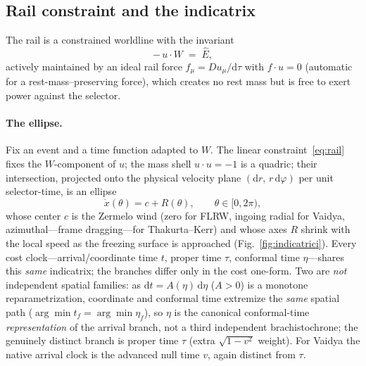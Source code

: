 \documentclass[
    aps, prd, twocolumn, superscriptaddress,
    showpacs, nofootinbib, floatfix
]{revtex4-2}
\newcommand{\Ehat}{\hat E}
\newcommand{\dd}{\mathrm{d}}
\begin{document}
\subsection{Rail constraint and the indicatrix}
\label{sec:indicatrix}
The rail is a constrained worldline with the invariant
\begin{equation}
    -\,u\cdot W \;=\; \Ehat ,
    \label{eq:rail}
\end{equation}
actively maintained by an ideal rail force $f_\mu=Du_\mu/\dd\tau$ with
$f\cdot u=0$ (automatic for a rest-mass--preserving force), which creates no rest
mass but is free to exert power against the selector.

\paragraph{The ellipse.} Fix an event and a time function adapted to $W$. The
linear constraint~\eqref{eq:rail} fixes the $W$-component of $u$; the mass shell
$u\cdot u=-1$ is a quadric; their intersection, projected onto the physical
velocity plane $(\dd r,\,r\,\dd\varphi)$ per unit selector-time, is an ellipse
\begin{equation}
    \dot x(\theta)=c+R(\theta),\qquad \theta\in[0,2\pi),
    \label{eq:ellipse}
\end{equation}
whose center $c$ is the Zermelo wind (zero for FLRW, ingoing radial for Vaidya,
azimuthal---frame dragging---for Thakurta--Kerr) and whose axes $R$ shrink with
the local speed as the freezing surface is approached (Fig.~\ref{fig:indicatrici}).
Every cost clock---arrival/coordinate time $t$, proper time $\tau$, conformal time
$\eta$---shares this \emph{same} indicatrix; the branches differ only in the cost
one-form. Two are \emph{not} independent spatial families: as $\dd t=A(\eta)\,\dd\eta$
($A>0$) is a monotone reparametrization, coordinate and conformal time extremize the
\emph{same} spatial path ($\arg\min t_f=\arg\min\eta_f$), so $\eta$ is the canonical
conformal-time \emph{representation} of the arrival branch, not a third independent
brachistochrone; the genuinely distinct branch is proper time $\tau$ (extra
$\sqrt{1-v^2}$ weight). For Vaidya the native arrival clock is the advanced null time
$v$, again distinct from $\tau$.
\end{document}
